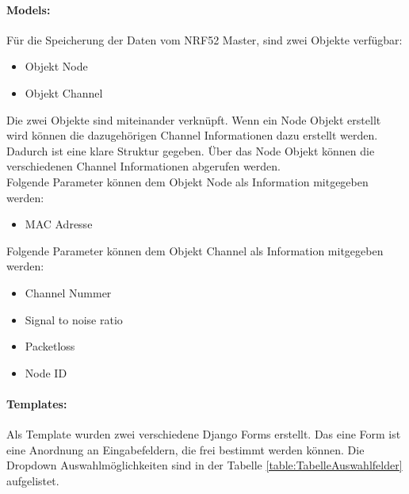 \newpage
\paragraph{Models: }\label{par:2Models}
Für die Speicherung der Daten vom NRF52 Master, sind zwei Objekte verfügbar: 
\begin{itemize}
	\item Objekt Node
	\item Objekt Channel
\end{itemize} 

\vspace{3mm}
Die zwei Objekte sind miteinander verknüpft. Wenn ein Node Objekt erstellt wird können die dazugehörigen Channel Informationen dazu erstellt werden. Dadurch ist eine klare Struktur gegeben. Über das Node Objekt können die verschiedenen Channel Informationen abgerufen werden. \\


Folgende Parameter können dem Objekt Node als Information mitgegeben werden:
\begin{itemize}
	\item MAC Adresse
\end{itemize} 

\vspace{3mm}
Folgende Parameter können dem Objekt Channel als Information mitgegeben werden:
\begin{itemize}
	\item Channel Nummer
	\item Signal to noise ratio
	\item Packetloss
	\item Node ID
\end{itemize}

\vspace{5mm}
\paragraph{Templates: }\label{par:2Templates}
Als Template wurden zwei verschiedene Django Forms erstellt. Das eine Form ist eine Anordnung an Eingabefeldern, die frei bestimmt werden können. Die Dropdown Auswahlmöglichkeiten sind in der Tabelle \ref{table:TabelleAuswahlfelder} aufgelistet.


